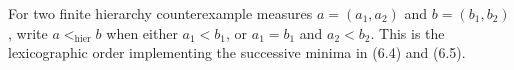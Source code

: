 \begin{definition}
For two finite hierarchy counterexample measures
$a=(a_1,a_2)$ and $b=(b_1,b_2)$, write $a<_{\mathrm{hier}}b$ when
either $a_1<b_1$, or $a_1=b_1$ and $a_2<b_2$.  This is the
lexicographic order implementing the successive minima in (6.4) and
(6.5).
\end{definition}
